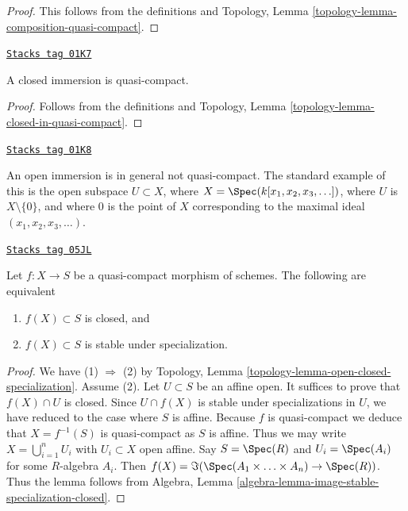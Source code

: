 \begin{proof}
This follows from the definitions and
Topology, Lemma \ref{topology-lemma-composition-quasi-compact}.
\end{proof}

\begin{lemma}
\label{schemes-lemma-closed-immersion-quasi-compact}
\href{https://stacks.math.columbia.edu/tag/01K7}{\texttt{Stacks tag 01K7}}

A closed immersion is quasi-compact.
\end{lemma}

\begin{proof}
Follows from the definitions and
Topology, Lemma \ref{topology-lemma-closed-in-quasi-compact}.
\end{proof}

\begin{example}
\label{schemes-example-open-immersion-not-quasi-compact}
\href{https://stacks.math.columbia.edu/tag/01K8}{\texttt{Stacks tag 01K8}}

An open immersion is in general not quasi-compact.
The standard example of this is the open subspace
$U \subset X$, where $X = \Spec(k[x_1, x_2, x_3, \ldots])$,
where $U$ is $X \setminus \{0\}$, and where $0$ is the point
of $X$ corresponding to the maximal ideal
$(x_1, x_2, x_3, \ldots)$.
\end{example}

\begin{lemma}
\label{schemes-lemma-image-quasi-compact-closed}
\href{https://stacks.math.columbia.edu/tag/05JL}{\texttt{Stacks tag 05JL}}

Let $f : X \to S$ be a quasi-compact morphism of schemes.
The following are equivalent
\begin{enumerate}
\item $f(X) \subset S$ is closed, and
\item $f(X) \subset S$ is stable under specialization.
\end{enumerate}
\end{lemma}

\begin{proof}
We have (1) $\Rightarrow$ (2) by
Topology, Lemma \ref{topology-lemma-open-closed-specialization}.
Assume (2). Let $U \subset S$ be an affine open. It suffices to prove
that $f(X) \cap U$ is closed. Since $U \cap f(X)$ is stable under
specializations in $U$, we have reduced to the case where $S$ is affine.
Because $f$ is quasi-compact we deduce that $X = f^{-1}(S)$ is
quasi-compact as $S$ is affine. Thus we may write
$X = \bigcup_{i = 1}^n U_i$ with $U_i \subset X$ open affine.
Say $S = \Spec(R)$ and
$U_i = \Spec(A_i)$ for some $R$-algebra $A_i$.
Then $f(X) = \Im(\Spec(A_1 \times \ldots \times A_n)
\to \Spec(R))$. Thus the lemma follows from
Algebra, Lemma \ref{algebra-lemma-image-stable-specialization-closed}.
\end{proof}

